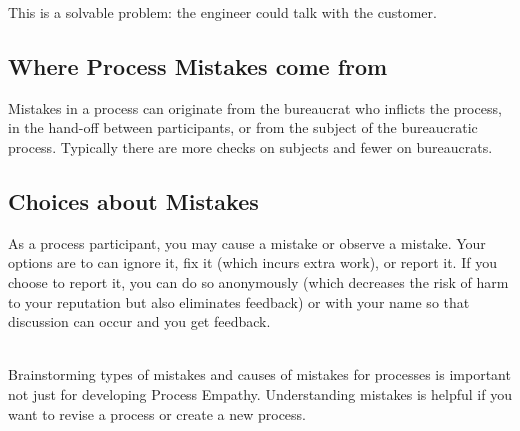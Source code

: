 This is a solvable problem: the engineer could talk with the customer. 



\subsection*{Where Process Mistakes come from}
Mistakes in a process can originate from the bureaucrat who inflicts the process, in the hand-off between participants, or from the \gls{subject} of the bureaucratic process. Typically there are more checks on subjects and fewer on bureaucrats. 

\subsection*{Choices about Mistakes}
As a process participant, you may cause a mistake or observe a mistake. Your options are to can ignore it, fix it (which incurs extra work), or report it. If you choose to report it, you can do so anonymously (which decreases the risk of harm to your reputation but also eliminates feedback) or with your name so that discussion can occur and you get feedback.

\ \\

Brainstorming types of mistakes and causes of mistakes for processes is important not just for developing Process Empathy. Understanding mistakes is helpful if you want to revise a process or create a new process.